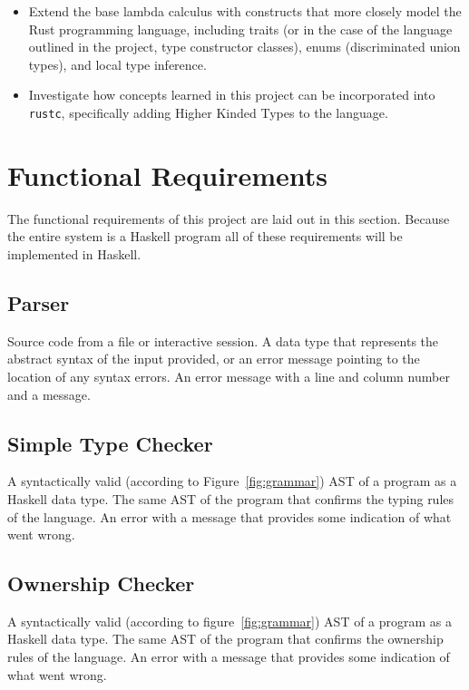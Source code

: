 \begin{itemize}
    \item
        Extend the base lambda calculus with constructs that more closely model
        the Rust programming language, including traits (or in the case of the
        language outlined in the project, type constructor classes), enums 
        (discriminated union types), and local type inference.
    \item
        Investigate how concepts learned in this project can be incorporated
        into \texttt{rustc}, specifically adding Higher Kinded Types to the
        language.
\end{itemize}

\section{Functional Requirements}\label{sec:functional}
The functional requirements of this project are laid out in this section.
Because the entire system is a Haskell program all of these requirements will
be implemented in Haskell.

\subsection{Parser}\label{sec:parser}
{Source code from a file or interactive session.}
{A data type that represents the abstract syntax of the input provided, or an
error message pointing to the location of any syntax errors.}
{An error message with a line and column number and a message.}

\subsection{Simple Type Checker}\label{sec:typecheck}
 {A
syntactically valid (according to Figure~\ref{fig:grammar}) AST of a program as
a Haskell data type.} {The same AST of the program that confirms the typing
rules of the language.} {An error with a message that provides some indication
of what went wrong.}

\subsection{Ownership Checker}\label{sec:owncheck}
 {A syntactically valid (according to figure~\ref{fig:grammar}) AST
of a program as a Haskell data type.} {The same AST of the program that
confirms the ownership rules of the language.} {An error with a message that
provides some indication of what went wrong.}


